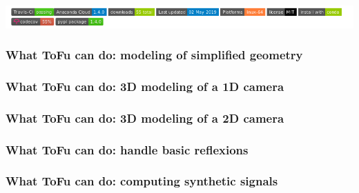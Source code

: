 \documentclass[10pt]{beamer}
\begin{document}
\begin{frame}
\begin{columns}
\begin{column}{0.35\textwidth}
\begin{center}
\end{center}
\end{column}
\end{columns}
\begin{center}
    	\includegraphics[width=\textwidth]{figures/badges.png}
\end{center}

\end{frame}



\begin{frame}
\frametitle{What ToFu can do: modeling of simplified geometry}
	
\end{frame}

\begin{frame}
\frametitle{What ToFu can do: 3D modeling of a 1D camera}
	
\end{frame}

\begin{frame}
\frametitle{What ToFu can do: 3D modeling of a 2D camera}
	
\end{frame}

\begin{frame}
\frametitle{What ToFu can do: handle basic reflexions}
	
\end{frame}

\begin{frame}
\frametitle{What ToFu can do: computing synthetic signals}
	
\end{frame}
\end{document}
